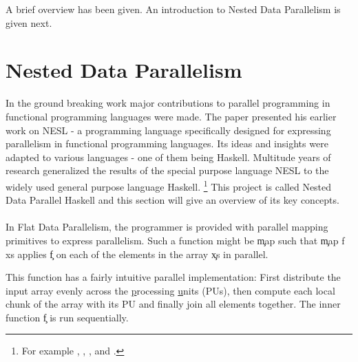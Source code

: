   \p
  A brief overview has been given. An introduction to Nested Data Parallelism is given next.



\section{Nested Data Parallelism}
  \label{section:ndpintro}
  
  In the ground breaking work \cite{Belloch1996}
  major contributions to parallel programming in
  functional programming languages were made.
  The paper presented his earlier work \cite{NepaBelloch1993} on NESL
  - a programming language specifically designed for expressing parallelism
  in functional programming languages. Its ideas and insights were
  adapted to various languages - one of them being Haskell.
  Multitude years of research generalized the
  results of the special purpose language NESL
  to the widely used general purpose language Haskell.
  \footnote{For example \cite{Harness2008}, \cite{DPHStatus2007},
  \cite{EffiVect2012Lipp}, \cite{HighOrdFlat2006} and \cite{DistTypes1999}.}
  This project is called Nested Data Parallel Haskell and this section will give
  an overview of its key concepts.
  
  \paragraph{}
    In Flat Data Parallelism, the programmer is provided with parallel mapping primitives
    to express parallelism. Such a function might be \c{map} such that \c{map f xs} applies \c{f}
    on each of the elements in the array \c{xs} in parallel.
    
    
    
    This function has a fairly intuitive parallel implementation:
    First distribute the input array evenly across the \underline{p}rocessing \underline{u}nits (PUs),
    then compute each local chunk of the array with its PU and finally join all elements together.
    The inner function \c{f} is run sequentially.
    
    
